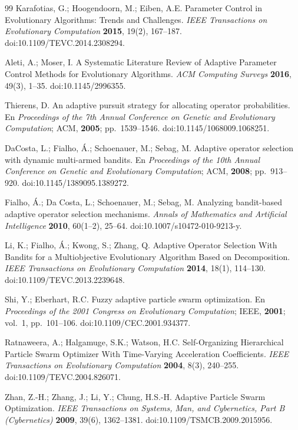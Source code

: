 \documentclass[10pt,a4paper]{article}
\begin{document}
\begin{thebibliography}{99}
 Karafotias, G.; Hoogendoorn, M.; Eiben, A.E. Parameter Control in
Evolutionary Algorithms: Trends and Challenges. \emph{IEEE Transactions on Evolutionary
Computation} \textbf{2015}, 19(2), 167--187. doi:10.1109/TEVC.2014.2308294.

 Aleti, A.; Moser, I. A Systematic Literature Review of Adaptive Parameter
Control Methods for Evolutionary Algorithms. \emph{ACM Computing Surveys} \textbf{2016}, 49(3),
1--35. doi:10.1145/2996355.

 Thierens, D. An adaptive pursuit strategy for allocating operator
probabilities. En \emph{Proceedings of the 7th Annual Conference on Genetic and Evolutionary
Computation}; ACM, \textbf{2005}; pp.~1539--1546. doi:10.1145/1068009.1068251.

 DaCosta, L.; Fialho, Á.; Schoenauer, M.; Sebag, M. Adaptive operator
selection with dynamic multi-armed bandits. En \emph{Proceedings of the 10th Annual Conference on
Genetic and Evolutionary Computation}; ACM, \textbf{2008}; pp.~913--920.
doi:10.1145/1389095.1389272.

 Fialho, Á.; Da Costa, L.; Schoenauer, M.; Sebag, M. Analyzing bandit-based
adaptive operator selection mechanisms. \emph{Annals of Mathematics and Artificial Intelligence}
\textbf{2010}, 60(1--2), 25--64. doi:10.1007/s10472-010-9213-y.

 Li, K.; Fialho, Á.; Kwong, S.; Zhang, Q. Adaptive Operator Selection With Bandits
for a Multiobjective Evolutionary Algorithm Based on Decomposition. \emph{IEEE Transactions on
Evolutionary Computation} \textbf{2014}, 18(1), 114--130. doi:10.1109/TEVC.2013.2239648.

 Shi, Y.; Eberhart, R.C. Fuzzy adaptive particle swarm optimization. En
\emph{Proceedings of the 2001 Congress on Evolutionary Computation}; IEEE, \textbf{2001}; vol.~1,
pp.~101--106. doi:10.1109/CEC.2001.934377.

 Ratnaweera, A.; Halgamuge, S.K.; Watson, H.C. Self-Organizing Hierarchical
Particle Swarm Optimizer With Time-Varying Acceleration Coefficients. \emph{IEEE Transactions on
Evolutionary Computation} \textbf{2004}, 8(3), 240--255. doi:10.1109/TEVC.2004.826071.

 Zhan, Z.-H.; Zhang, J.; Li, Y.; Chung, H.S.-H. Adaptive Particle Swarm
Optimization. \emph{IEEE Transactions on Systems, Man, and Cybernetics, Part B (Cybernetics)}
\textbf{2009}, 39(6), 1362--1381. doi:10.1109/TSMCB.2009.2015956.


\end{thebibliography}
\end{document}
